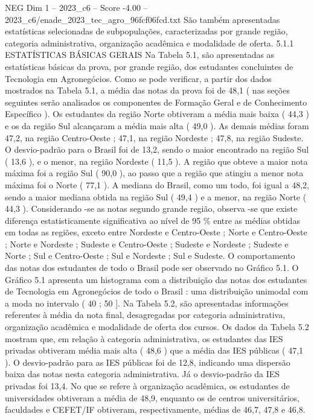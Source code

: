 \begin{textsample}{NEG Dim 1 – 2023\_c6 – Score -4.00 – 2023\_c6/enade\_2023\_tec\_agro\_96fcf06fcd.txt}
São também apresentadas estatísticas selecionadas de subpopulações, caracterizadas por grande região, categoria administrativa, organização acadêmica e modalidade de oferta. 5.1.1 ESTATÍSTICAS BÁSICAS GERAIS Na Tabela 5.1, são apresentadas as estatísticas básicas da prova, por grande região, dos estudantes concluintes de Tecnologia em Agronegócios.
Como se pode verificar, a partir dos dados mostrados na Tabela 5.1, a média das notas da prova foi de 48,1 ( nas seções seguintes serão analisados os componentes de Formação Geral e de Conhecimento Específico ).
Os estudantes da região Norte obtiveram a média mais baixa ( 44,3 ) e os da região Sul alcançaram a média mais alta ( 49,0 ).
As demais médias foram 47,2, na região Centro-Oeste ; 47,1, na região Nordeste ; 47,8, na região Sudeste.
O desvio-padrão para o Brasil foi de 13,2, sendo o maior encontrado na região Sul ( 13,6 ), e o menor, na região Nordeste ( 11,5 ).
A região que obteve a maior nota máxima foi a região Sul ( 90,0 ), ao passo que a região que atingiu a menor nota máxima foi o Norte ( 77,1 ).
A mediana do Brasil, como um todo, foi igual a 48,2, sendo a maior mediana obtida na região Sul ( 49,4 ) e a menor, na região Norte ( 44,3 ).
Considerando -se as notas segundo grande região, observa -se que existe diferença estatisticamente significativa ao nível de 95 \% entre as médias obtidas em todas as regiões, exceto entre Nordeste e Centro-Oeste ; Norte e Centro-Oeste ; Norte e Nordeste ; Sudeste e Centro-Oeste ; Sudeste e Nordeste ; Sudeste e Norte ; Sul e Centro-Oeste ; Sul e Nordeste ; Sul e Sudeste.
O comportamento das notas dos estudantes de todo o Brasil pode ser observado no Gráfico 5.1.
O Gráfico 5.1 apresenta um histograma com a distribuição das notas dos estudantes de Tecnologia em Agronegócios de todo o Brasil : uma distribuição unimodal com a moda no intervalo ( 40 ; 50 ].
Na Tabela 5.2, são apresentadas informações referentes à média da nota final, desagregadas por categoria administrativa, organização acadêmica e modalidade de oferta dos cursos.
Os dados da Tabela 5.2 mostram que, em relação à categoria administrativa, os estudantes das IES privadas obtiveram média mais alta ( 48,6 ) que a média das IES públicas ( 47,1 ).
O desvio-padrão para as IES públicas foi de 12,8, indicando uma dispersão baixa das notas nesta categoria administrativa.
Já o desvio-padrão da IES privadas foi 13,4.
No que se refere à organização acadêmica, os estudantes de universidades obtiveram a média de 48,9, enquanto os de centros universitários, faculdades e CEFET/IF obtiveram, respectivamente, médias de 46,7, 47,8 e 46,8.

\end{textsample}
